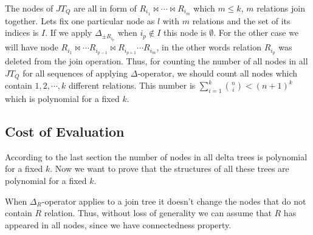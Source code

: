 \documentclass[12pt]{article}
\begin{document}
The nodes of $JT_{Q}$ are all in form of $R_{i_{1}}\bowtie\cdots\bowtie R_{i_{m}}$ which $m\leq k$, $m$ relations join together. Lets fix one particular node as $l$ with $m$ relations and the set of its indices is $I$. If we apply $\Delta_{\pm R_{i_{p}}}$ when $i_{p}\not\in I$ this node is $\emptyset$. For the other case we will have node $R_{i_{1}}\bowtie\cdots R_{i_{p-1}}\bowtie R_{i_{p+1}}\cdots R_{i_{m}}$, in the other words relation $R_{i_{p}}$ was deleted from the join operation. Thus, for counting the number of all nodes in all $JT_{Q}$ for all sequences of applying $\Delta$-operator, we should count all nodes which contain $1,2,\cdots,k$ different relations. This number is 
$\sum_{i=1}^{k}{\binom{n}{i}}<(n+1)^{k}$ which is polynomial for a fixed $k$. \\

\subsection{Cost of Evaluation}
According to the last section the number of nodes in all delta trees is polynomial for a fixed $k$. Now we want to prove that the structures of all these trees are polynomial for a fixed $k$. \\

\begin{figure}[htbp]
\begin{center}
\end{center}
\caption{}
\label{fig2}
\end{figure}

When $\Delta_{R}$-operator applies to a join tree it doesn't change the nodes that do not contain $R$ relation. Thus, without loss of generality we can assume that $R$ has appeared in all nodes, since we have connectedness property. 
\end{document}
